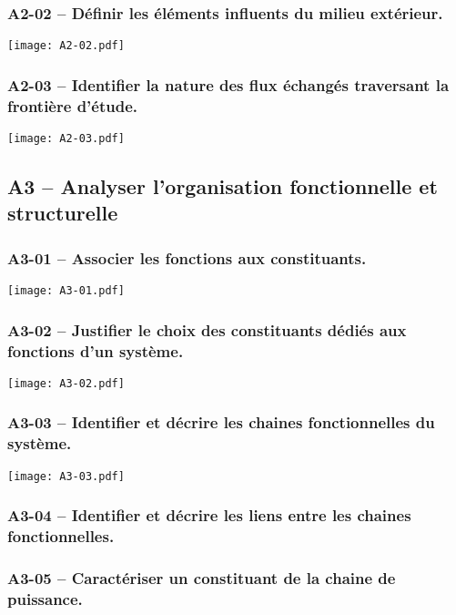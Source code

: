 \subsubsection*{A2-02 -- Définir les éléments influents du milieu extérieur. }  
\begin{center} 
\texttt{[image: A2-02.pdf]} 
\end{center} 
\subsubsection*{A2-03 -- Identifier la nature des flux échangés traversant la frontière d’étude.}  
\begin{center} 
\texttt{[image: A2-03.pdf]} 
\end{center} 
\subsection{A3 -- Analyser l'organisation fonctionnelle et structurelle}  
\subsubsection*{A3-01 -- Associer les fonctions aux constituants.}  
\begin{center} 
\texttt{[image: A3-01.pdf]} 
\end{center} 
\subsubsection*{A3-02 -- Justifier le choix des constituants dédiés aux fonctions d’un système.}  
\begin{center} 
\texttt{[image: A3-02.pdf]} 
\end{center} 
\subsubsection*{A3-03 -- Identifier et décrire les chaines fonctionnelles du système.}  
\begin{center} 
\texttt{[image: A3-03.pdf]} 
\end{center} 
\subsubsection*{A3-04 -- Identifier et décrire les liens entre les chaines fonctionnelles.}  
\subsubsection*{A3-05 -- Caractériser un constituant de la chaine de puissance.}  
